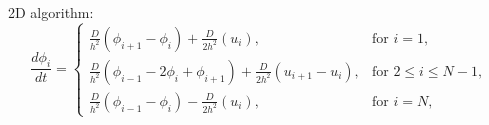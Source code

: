 2D algorithm:
%
\begin{equation}
\frac{d\phi_i}{dt} = \begin{cases}
		\frac{D}{h^2}(\phi_{i+1} - \phi_{i}) + \frac{D}{2h^2} (u_{i}), & \text{for } i = 1, \\
		\frac{D}{h^2}(\phi_{i-1}-2\phi_i +\phi_{i+1}) + \frac{D}{2h^2} (u_{i+1}-u_{i}), & \text{for } 2 \leq i \leq N-1, \\
		\frac{D}{h^2}(\phi_{i-1}-\phi_i) - \frac{D}{2h^2} (u_{i}), & \text{for } i = N ,
		\end{cases}
        \label{eqn:discrete_diffusion}
\end{equation}
%
